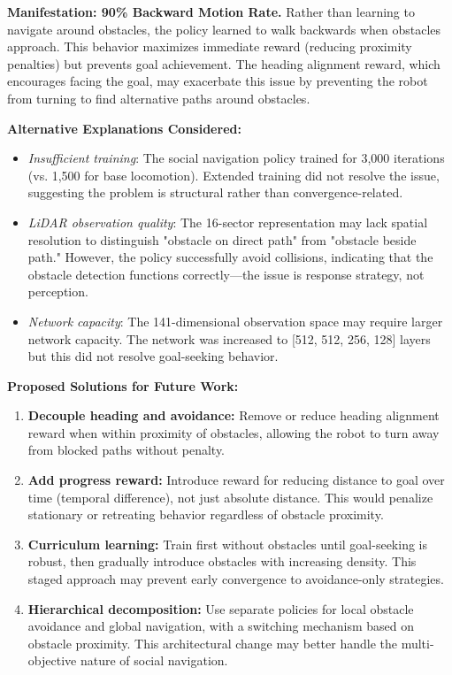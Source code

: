 \documentclass[12pt,a4paper]{article}
\begin{document}
\textbf{Manifestation: 90\% Backward Motion Rate.} Rather than learning to navigate around obstacles, the policy learned to walk backwards when obstacles approach. This behavior maximizes immediate reward (reducing proximity penalties) but prevents goal achievement. The heading alignment reward, which encourages facing the goal, may exacerbate this issue by preventing the robot from turning to find alternative paths around obstacles.

\textbf{Alternative Explanations Considered:}
\begin{itemize}
    \item \textit{Insufficient training}: The social navigation policy trained for 3,000 iterations (vs. 1,500 for base locomotion). Extended training did not resolve the issue, suggesting the problem is structural rather than convergence-related.

    \item \textit{LiDAR observation quality}: The 16-sector representation may lack spatial resolution to distinguish "obstacle on direct path" from "obstacle beside path." However, the policy successfully avoid collisions, indicating that the obstacle detection functions correctly---the issue is response strategy, not perception.

    \item \textit{Network capacity}: The 141-dimensional observation space may require larger network capacity. The network was increased to [512, 512, 256, 128] layers but this did not resolve goal-seeking behavior.
\end{itemize}

\textbf{Proposed Solutions for Future Work:}
\begin{enumerate}
    \item \textbf{Decouple heading and avoidance:} Remove or reduce heading alignment reward when within proximity of obstacles, allowing the robot to turn away from blocked paths without penalty.

    \item \textbf{Add progress reward:} Introduce reward for reducing distance to goal over time (temporal difference), not just absolute distance. This would penalize stationary or retreating behavior regardless of obstacle proximity.

    \item \textbf{Curriculum learning:} Train first without obstacles until goal-seeking is robust, then gradually introduce obstacles with increasing density. This staged approach may prevent early convergence to avoidance-only strategies.

    \item \textbf{Hierarchical decomposition:} Use separate policies for local obstacle avoidance and global navigation, with a switching mechanism based on obstacle proximity. This architectural change may better handle the multi-objective nature of social navigation.
\end{enumerate}
\end{document}
